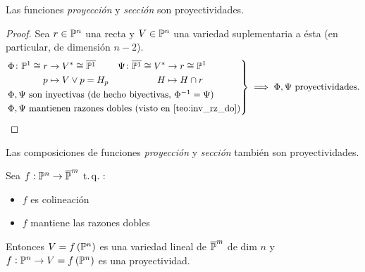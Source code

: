 \begin{col}
    Las funciones \textit{proyección} y \textit{sección} son proyectividades.
\end{col}
\begin{proof}
    Sea $r \in \mathbb{P}^n$ una recta y $V \in \mathbb{P}^n$ una variedad suplementaria a ésta
    (en particular, de dimensión $n-2$).
    \[
        \begin{rcases}
            \begin{aligned}
            \Phi \colon \mathbb{P}^1 \cong r &\to V^\ast \cong \overline{\mathbb{P}^1} \\
            p &\mapsto V \vee p = H_p
            \end{aligned}
            \quad
            \begin{aligned}
            \Psi \colon \overline{\mathbb{P}^1} \cong V^* &\to r \cong \mathbb{P}^1 \\ H &\mapsto H \cap r
            \end{aligned} \\
            \Phi, \Psi \text{ son inyectivas (de hecho biyectivas, } \Phi^{-1} = \Psi
            \text{)}\\
            \Phi, \Psi \text{ mantienen razones dobles (visto en \ref{teo:inv_rz_do})}
    \end{rcases}
    \implies
    \Phi, \Psi \text{ proyectividades.}
 \]
\end{proof}
\begin{obs}
    Las composiciones de funciones \textit{proyección} y \textit{sección} también son proyectividades.
\end{obs}
\begin{prop} \label{prop:demo_teo2}
    Sea $f : \mathbb{P}^n \to \overline{\mathbb{P}}^m \operatorname{\;t.q.\;}$:
    \begin{itemize}
        \item $f$ es colineación
        \item $f$ mantiene las razones dobles
    \end{itemize}
    Entonces $V = f \left( \mathbb{P}^n \right)$ es una variedad lineal de $\overline{\mathbb{P}}^m$ de dim $n$ y $f : \mathbb{P}^n \to V = f \left( \mathbb{P}^n \right)$ es una proyectividad.
\end{prop}
